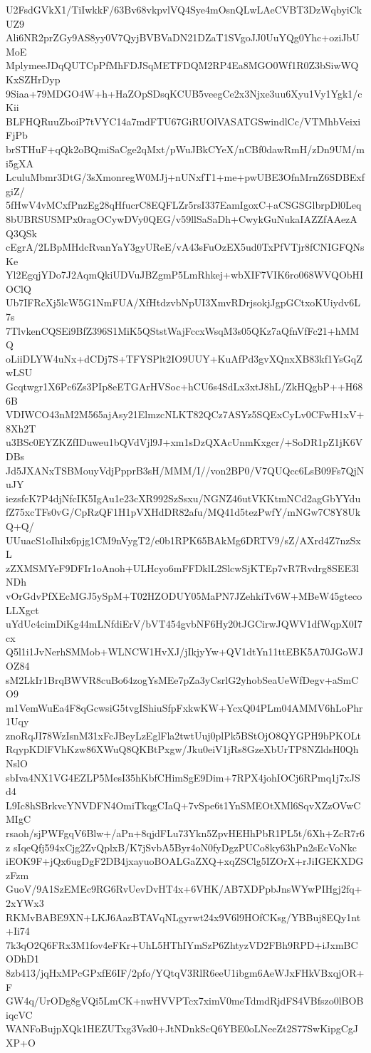 U2FsdGVkX1/TiIwkkF/63Bv68vkpvlVQ4Sye4mOsnQLwLAeCVBT3DzWqbyiCkUZ9
Ali6NR2prZGy9AS8yy0V7QyjBVBVaDN21DZaT1SVgoJJ0UuYQg0Yhc+oziJbUMoE
MplymeeJDqQUTCpPfMhFDJSqMETFDQM2RP4Ea8MGO0Wf1R0Z3bSiwWQKxSZHrDyp
9Siaa+79MDGO4W+h+HaZOpSDsqKCUB5veegCe2x3Njxe3uu6Xyu1Vy1Ygk1/cKii
BLFHQRuuZboiP7tVYC14a7mdFTU67GiRUOlVASATGSwindlCc/VTMhbVeixiFjPb
brSTHuF+qQk2oBQmiSaCge2qMxt/pWuJBkCYeX/nCBf0dawRmH/zDn9UM/mi5gXA
LculuMbmr3DtG/3sXmonregW0MJj+nUNxfT1+me+pwUBE3OfnMrnZ6SDBExfgiZ/
5fHwV4vMCxfPnzEg28qHfucrC8EQFLZr5rsI337EamIgoxC+aCSGSGlbrpDl0Leq
8bUBRSUSMPx0ragOCywDVy0QEG/v59llSaSaDh+CwykGuNukaIAZZfAAezAQ3QSk
cEgrA/2LBpMHdcRvanYaY3gyUReE/vA43sFuOzEX5ud0TxPfVTjr8fCNIGFQNsKe
Yl2EgqjYDo7J2AqmQkiUDVuJBZgmP5LmRhkej+wbXIF7VIK6ro068WVQObHIOClQ
Ub7IFRcXj5lcW5G1NmFUA/XfHtdzvbNpUI3XmvRDrjsokjJgpGCtxoKUiydv6L7s
7TlvkenCQSEi9BfZ396S1MiK5QStstWajFccxWsqM3s05QKz7aQfnVfFc21+hMMQ
oLiiDLYW4uNx+dCDj7S+TFYSPlt2IO9UUY+KuAfPd3gvXQnxXB83kf1YsGqZwLSU
Gcqtwgr1X6Pc6Zs3PIp8eETGArHVSoc+hCU6s4SdLx3xtJ8hL/ZkHQgbP++H686B
VDIWCO43nM2M565ajAsy21ElmzcNLKT82QCz7ASYz5SQExCyLv0CFwH1xV+8Xh2T
u3BSc0EYZKZfIDuweu1bQVdVjl9J+xm1sDzQXAcUnmKxgcr/+SoDR1pZ1jK6VDBs
Jd5JXANxTSBMouyVdjPpprB3sH/MMM/I//von2BP0/V7QUQcc6LsB09Fs7QjNuJY
iezsfcK7P4djNfcIK5IgAu1e23cXR992SzSsxu/NGNZ46utVKKtmNCd2agGbYYdu
fZ75xcTFs0vG/CpRzQF1H1pVXHdDR82afu/MQ41d5tezPwfY/mNGw7C8Y8UkQ+Q/
UUuacS1oIhilx6pjg1CM9nVygT2/e0b1RPK65BAkMg6DRTV9/sZ/AXrd4Z7nzSxL
zZXMSMYeF9DFIr1oAnoh+ULHcyo6mFFDklL2SlcwSjKTEp7vR7Rvdrg8SEE3lNDh
vOrGdvPfXEcMGJ5ySpM+T02HZODUY05MaPN7JZehkiTv6W+MBeW45gtecoLLXgct
uYdUc4cimDiKg44mLNfdiErV/bVT454gvbNF6Hy20tJGCirwJQWV1dfWqpX0I7cx
Q5l1i1JvNerhSMMob+WLNCW1HvXJ/jIkjyYw+QV1dtYn11ttEBK5A70JGoWJOZ84
sM2LkIr1BrqBWVR8cuBo64zogYsMEe7pZa3yCsrlG2yhobSeaUeWfDegv+aSmCO9
m1VemWuEa4F8qGcwsiG5tvgIShiuSfpFxkwKW+YcxQ04PLm04AMMV6hLoPhr1Uqy
znoRqJI78WzIsnM31xFcJBeyLzEglFla2twtUuj0plPk5BStOjO8QYGPH9bPKOLt
RqypKDlFVhKzw86XWuQ8QKBtPxgw/Jku0eiV1jRs8GzeXbUrTP8NZldsH0QhNslO
sbIva4NX1VG4EZLP5MesI35hKbfCHimSgE9Dim+7RPX4johIOCj6RPmq1j7xJSd4
L9Ic8hSBrkvcYNVDFN4OmiTkqgCIaQ+7vSpe6t1YnSMEOtXMl6SqvXZzOVwCMIgC
rsaoh/sjPWFgqV6Blw+/aPn+8qjdFLu73Ykn5ZpvHEHhPbR1PL5t/6Xh+ZcR7r6z
sIqeQfj594xCjg2ZvQplxB/K7jSvbA5Byr4oN0fyDgzPUCo8ky63hPn2sEcVoNkc
iEOK9F+jQx6ugDgF2DB4jxayuoBOALGaZXQ+xqZSClg5IZOrX+rJiIGEKXDGzFzm
GuoV/9A1SzEMEc9RG6RvUevDvHT4x+6VHK/AB7XDPpbJnsWYwPIHgj2fq+2xYWx3
RKMvBABE9XN+LKJ6AazBTAVqNLgyrwt24x9V6l9HOfCKsg/YBBuj8EQy1nt+Ii74
7k3qO2Q6FRx3M1fov4eFKr+UhL5HThIYmSzP6ZhtyzVD2FBh9RPD+iJxmBCODhD1
8zb413/jqHxMPcGPxfE6IF/2pfo/YQtqV3RlR6eeU1ibgm6AeWJxFHkVBxqjOR+F
GW4q/UrODg8gVQi5LmCK+nwHVVPTcx7ximV0meTdmdRjdFS4VBfszo0lBOBiqcVC
WANFoBujpXQk1HEZUTxg3Vsd0+JtNDnkScQ6YBE0oLNeeZt2S77SwKipgCgJXP+O
